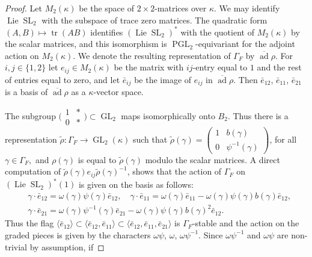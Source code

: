 \documentclass{amsart}
\theoremstyle{definition}
\theoremstyle{remark}
\DeclareMathOperator{\GL}{GL}
\DeclareMathOperator{\SL}{SL}
\DeclareMathOperator{\tr}{tr}
\DeclareMathOperator{\ad}{ad}
\DeclareMathOperator{\PGL}{PGL}
\DeclareMathOperator{\Lie}{Lie}
\begin{document}
\begin{proof} Let $M_2(\kappa)$ be the space of $2\times 2$-matrices over $\kappa$. We may identify 
$\Lie \SL_2$ with the subspace of trace zero matrices. The quadratic form $(A, B)\mapsto 
\tr(AB)$ identifies $(\Lie \SL_2)^*$ with the quotient of $M_2(\kappa)$ by the scalar matrices, 
and this isomorphism is $\PGL_2$-equivariant for the adjoint action on $M_2(\kappa)$. 
We denote the resulting representation of $\Gamma_F$ by $\overline{\ad} \rho$. 
For $i, j\in \{1,2\}$ let $e_{ij}\in M_2(\kappa)$ be the matrix with $ij$-entry equal to $1$ 
and the rest of entries equal to zero, and let $\bar{e}_{ij}$ be the image of $e_{ij}$ in 
$\overline{\ad} \rho$. Then  $\bar{e}_{12}$, $\bar{e}_{11}$, $\bar{e}_{21}$ is a basis of 
$\overline{\ad} \rho$ as a $\kappa$-vector space. 

The subgroup $\bigl( \begin{smallmatrix} 1 & \ast\\ 0 & \ast\end{smallmatrix}\bigr)\subset \GL_2$
maps isomorphically onto $B_2$. Thus there is a representation $\tilde{\rho}: \Gamma_F \rightarrow
\GL_2(\kappa)$ such that 
$ \tilde{\rho}(\gamma)= \left(\begin{smallmatrix} 1 & b(\gamma)\\ 0 & \psi^{-1}(\gamma)\end{smallmatrix}\right)$, for all $\gamma\in \Gamma_F,$
and $\rho(\gamma)$ is equal to $\tilde{\rho}(\gamma)$ modulo the scalar matrices. A direct computation of $\tilde{\rho}(\gamma) e_{ij} \tilde{\rho}(\gamma)^{-1}$, shows that 
the action of $\Gamma_F$ on $(\Lie \SL_2)^*(1)$ is given on the basis as follows: 
\begin{displaymath}
\begin{split}
 &\gamma \cdot \bar{e}_{12}= \omega(\gamma)\psi(\gamma)  \bar{e}_{12}, \quad 
\gamma \cdot \bar{e}_{11}= \omega(\gamma) \bar{e}_{11}- \omega(\gamma) \psi(\gamma)b(\gamma) \bar{e}_{12},\\
&\gamma \cdot \bar{e}_{21} = \omega(\gamma) \psi^{-1}(\gamma)\bar{e}_{21} -\omega(\gamma) \psi(\gamma) b(\gamma)^2 \bar{e}_{12}.
\end{split}
\end{displaymath}
Thus the flag $\langle \bar{e}_{12}\rangle \subset \langle \bar{e}_{12}, \bar{e}_{11}\rangle
\subset \langle \bar{e}_{12}, \bar{e}_{11}, \bar{e}_{21}\rangle$ is $\Gamma_F$-stable and
the action on the graded pieces is given by the characters $\omega \psi$, $\omega$, $\omega \psi^{-1}$. 
Since $\omega \psi^{-1}$ and $\omega \psi$ are non-trivial by assumption, if 

\end{proof}
\end{document}
